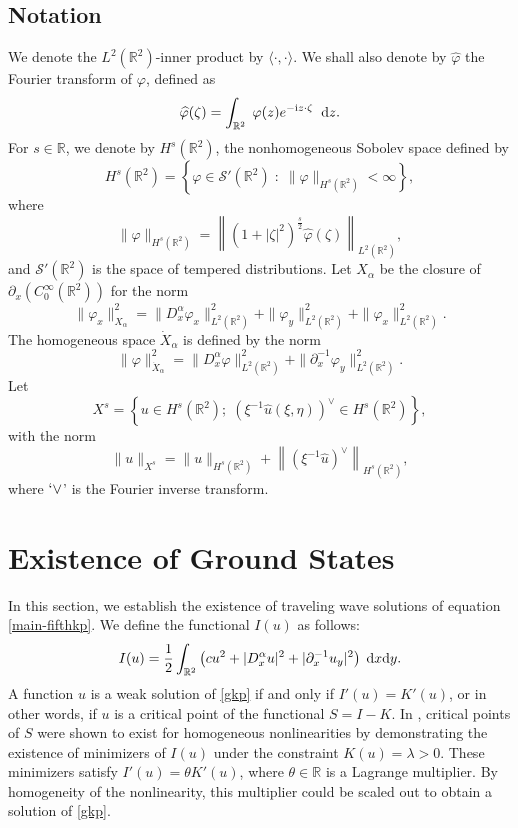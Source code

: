 \documentclass[10pt]{article}
\numberwithin{equation}{section}
\newcommand{\dd}{\;{\rm d}}
\newcommand{\dz}{\;{\rm d}x{\rm d}y}
\newcommand{\ff}{\varphi}
\newcommand{\ii}{{\rm i}}
\newcommand{\xx}{{\dot{X}_\alpha}}
\newcommand{\what}{\widehat}
\newcommand{\nd}{{\partial_x^{-1}}}
\newcommand{\dx}{D_x^{\alpha}}
\newcommand{\al}{\alpha}
\newcommand{\rr}{\mathbb{R}}
\newcommand{\rt}{{\mathbb{R}^2}}
\begin{document}
	\subsection*{Notation}
	We  denote the $L^2(\rr^2)$-inner product by $\langle\cdot,\cdot\rangle$.  We shall also denote by $\widehat\ff$ the Fourier transform of $\ff$, defined as
	\[
	\widehat\ff(\zeta)=\int_{\rr^2}\;\ff(z)e^{-\ii z\cdot \zeta}\;\dd z.
	\]
	For $s\in\rr$, we denote by
	$H^s\left(\rr^2\right)$, the nonhomogeneous Sobolev space defined by
	\[
	H^s\left(\rr^2\right)=\left\{\ff\in\mathscr{S}'\left(\rr^2\right)\;:\;\|\ff\|_{H^s\left(\rr^2\right)}<\infty\right\},
	\]
	where
	\[
	\|\ff\|_{H^s\left(\rr^2\right)}
	=\left\|\left(1+|\zeta|^2\right)^\frac{s}{2}\widehat{\ff}(\zeta)\right\|_{L^2\left(\rr^2\right)},
	\]
	and $\mathscr{S}'\left(\rr^2\right)$ is the space of tempered distributions. Let ${X_\al}$ be the closure of $\partial_x(C_0^\infty(\rr^2))$ for the norm
	\begin{equation}
		\|\ff_x\|_{X_\al}^2= \|\dx\ff_x\|_{L^2(\rr^2)}^2+\|\ff_y\|_{L^2(\rr^2)}^2
		+\|\ff_{x}\|_{L^2(\rr^2)}^2.
	\end{equation}
	The homogeneous space $\xx$ is defined by the norm
	\begin{equation}
		\|\ff\|_{\xx}^2= \|\dx\ff\|_{L^2(\rr^2)}^2+\|\nd\ff_y\|_{L^2(\rr^2)}^2.
	\end{equation}
	Let
	\[
	X^s=\left\{u\in H^s(\rr^2);\;\left(\xi^{-1}\what{u}(\xi,\eta)\right)^\vee\in H^s(\rr^2)\right\},
	\]
	with the norm
	\[
	\|u\|_{X^s}=\|u\|_{H^s(\rr^2)}+\left\|\left(\xi^{-1}\what{u}\right)^\vee\right\|_{H^s(\rr^2)},
	\]
	where $`\vee$' is the Fourier inverse transform.
	
	
	\section{Existence of Ground States}\label{sect-exist}
	In this section, we establish the existence of traveling wave solutions of equation \eqref{main-fifthkp}. We define the functional $I(u)$  as follows:
	\[
	I(u)=\frac{1}{2}\int_\rt\left(cu^2+|\dx u|^2+|\nd u_y|^2\right)\dz.
	\]
	A function $u$ is a weak solution of \eqref{gkp} if and only if \(I'(u) = K'(u)\), or in other words, if \(u\) is a critical point of the functional \(S = I - K\). In \cite{dbs-1}, critical points of \(S\) were shown to exist for homogeneous nonlinearities by demonstrating the existence of minimizers of \(I(u)\) under the constraint \(K(u) =\lambda > 0\). These minimizers satisfy \(I'(u) =\theta K'(u)\), where \(\theta\in\mathbb{R}\) is a Lagrange multiplier. By homogeneity of the nonlinearity, this multiplier could be scaled out to obtain a solution of \eqref{gkp}.
	
\end{document}
